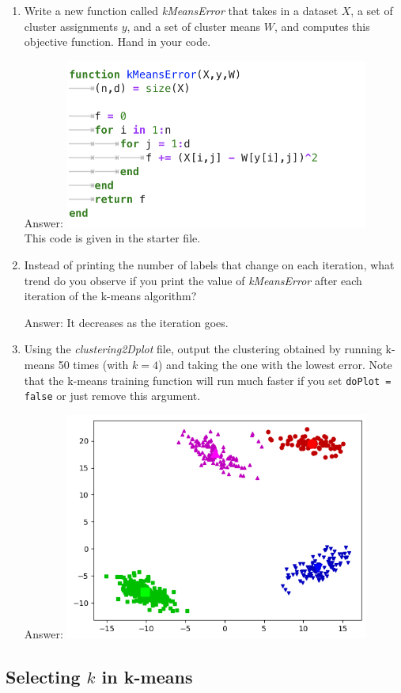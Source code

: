 \documentclass{article}
\def\ans#1{\par\gre{Answer: #1}}
\def\blu#1{{\color{blu}#1}}
\def\gre#1{{\color{gre}#1}}
\def\enum#1{\begin{enumerate}#1\end{enumerate}}
\begin{document}
 \blu{\enum{
 \item Write a new function called \emph{kMeansError} that takes in a dataset $X$, a set of cluster assignments $y$, and a set of cluster means $W$, and computes this objective function. Hand in your code.
 \ans{ \includegraphics[width = 10cm]{Q511KmeansError.png} \\ This code is given in the starter file.}
 \item Instead of printing the number of labels that change on each iteration, what trend do you observe if you print the value of \emph{kMeansError} after each iteration of the k-means algorithm? \ans{It decreases as the iteration goes.}
 \item Using the \emph{clustering2Dplot} file, output the clustering obtained by running k-means 50 times (with $k=4$) and taking the one with the lowest error. Note that the k-means training function will run much faster if you set \texttt{doPlot = false} or just remove this argument.
 \ans{\includegraphics[width = 10cm]{Kmeans.png}}
 }}
 
 \subsection{Selecting $k$ in k-means}
 
\end{document}

